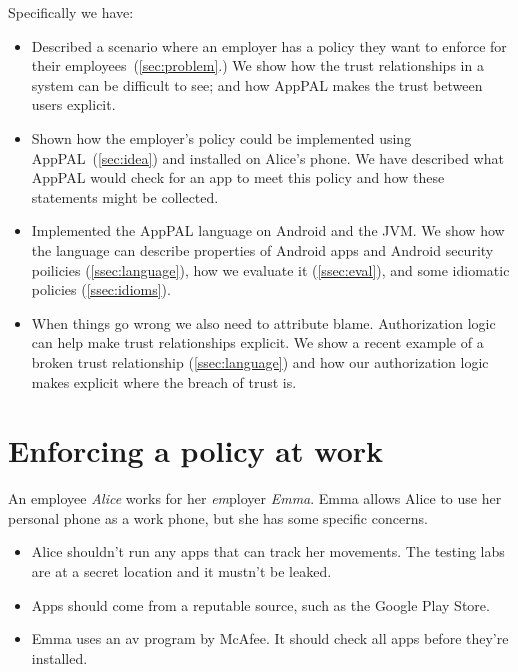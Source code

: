 \documentclass[]{scrartcl}
\begin{document}
Specifically we have:
\begin{itemize}
  \item
    Described a scenario where an employer has a policy they want to enforce for their employees~(\autoref{sec:problem}.)
    We show how the trust relationships in a system can be difficult to see;
      and how AppPAL makes the trust between users explicit.
  \item
    Shown how the employer's policy could be implemented using AppPAL~(\autoref{sec:idea}) and installed on Alice's phone.
    We have described what AppPAL would check for an app to meet this policy and how these statements might be collected.

  \item Implemented the AppPAL language on Android and the JVM.
    We show how the language can describe properties of Android apps and Android security poilicies (\autoref{ssec:language}),
      how we evaluate it (\autoref{ssec:eval}),
      and some idiomatic policies (\autoref{ssec:idioms}).

  \item When things go wrong we also need to attribute blame.
    Authorization logic can help make trust relationships explicit.
    We show a recent example of a broken trust relationship (\autoref{ssec:language})
    and how our authorization logic makes explicit where the breach of trust is.

\end{itemize}

\section{Enforcing a policy at work}
\label{sec:problem}

An employee \emph{Alice} works for her \emph{em\/}ployer \emph{Emma}.
Emma allows Alice to use her personal phone as a work phone, but she has some specific concerns.
\begin{itemize}
  \item Alice shouldn't run any apps that can track her movements.
    The testing labs are at a secret location and it mustn't be leaked.
  \item Apps should come from a reputable source, such as the Google Play Store.
  \item Emma uses an \ac{av} program by McAfee.
    It should check all apps before they're installed.
\end{itemize}
\end{document}
